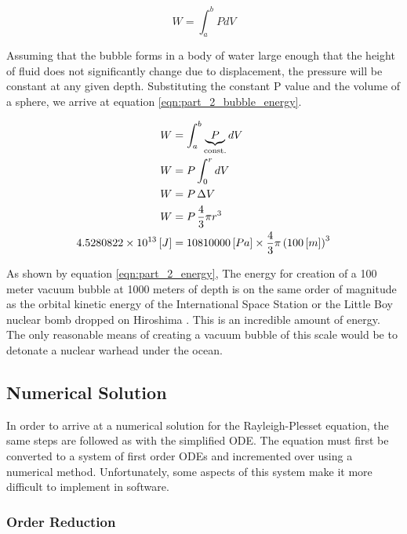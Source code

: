 \documentclass[12pt]{article}
\begin{document}
\begin{equation}
    \label{eqn:part_2_general_work}
    W = \int_a^b P dV
\end{equation}

\noindent Assuming that the bubble forms in a body of water large enough that the height of fluid does not significantly change due to displacement, the pressure will be constant at any given depth. Substituting the constant P value and the volume of a sphere, we arrive at equation \ref{eqn:part_2_bubble_energy}.

\begin{subequations}
    \centering
    \begin{align}
        W &= \int_a^b \underbrace{P}_{\text{const.}} dV \notag\\
        W &= P \int_0^r dV \notag\\
        W &= P \, \Delta V \notag\\
        W &= P \, \frac{4}{3} \pi r^3 \label{eqn:part_2_bubble_energy} \\
        4.5280822 \times 10^{13}\, [J]&= 10810000\, [Pa] \times \frac{4}{3} \pi \left(100 \,[m]\right)^3 \label{eqn:part_2_energy}
    \end{align}
\end{subequations}

As shown by equation \ref{eqn:part_2_energy}, The energy for creation of a 100 meter vacuum bubble at 1000 meters of depth is on the same order of magnitude as the orbital kinetic energy of the International Space Station \cite{iss_velocity}\cite{iss_mass} or the Little Boy nuclear bomb dropped on Hiroshima \cite{little_boy_yield}. This is an incredible amount of energy. The only reasonable means of creating a vacuum bubble of this scale would be to detonate a nuclear warhead under the ocean.

\subsection{Numerical Solution}

In order to arrive at a numerical solution for the Rayleigh-Plesset equation, the same steps are followed as with the simplified ODE. The equation must first be converted to a system of first order ODEs and incremented over using a numerical method. Unfortunately, some aspects of this system make it more difficult to implement in software.

\subsubsection{Order Reduction} \label{sec:part_2_order_reduction}
\end{document}
